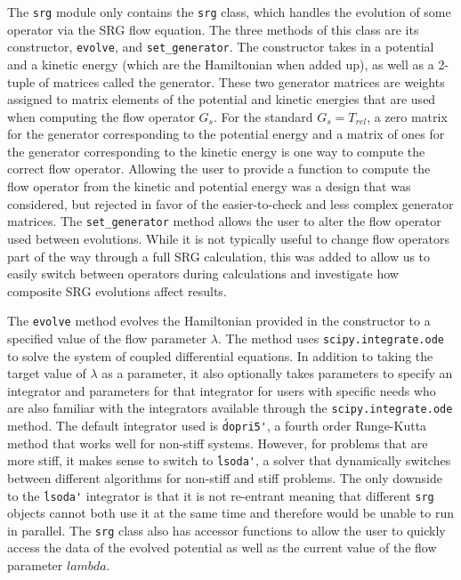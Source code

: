 The \texttt{srg} module only contains the \texttt{srg} class, which handles the evolution of some operator via the SRG flow equation. The three methods of this class are its constructor, \texttt{evolve}, and \texttt{set\_generator}. The constructor takes in a potential and a kinetic energy (which are the Hamiltonian when added up), as well as a 2-tuple of matrices called the generator. These two generator matrices are weights assigned to matrix elements of the potential and kinetic energies that are used when computing the flow operator $G_s$. For the standard $G_s = T_{rel}$, a zero matrix for the generator corresponding to the potential energy and a matrix of ones for the generator corresponding to the kinetic energy is one way to compute the correct flow operator. Allowing the user to provide a function to compute the flow operator from the kinetic and potential energy was a design that was considered, but rejected in favor of the easier-to-check and less complex generator matrices. The \texttt{set\_generator} method allows the user to alter the flow operator used between evolutions. While it is not typically useful to change flow operators part of the way through a full SRG calculation, this was added to allow us to easily switch between operators during calculations and investigate how composite SRG evolutions affect results.

The \texttt{evolve} method evolves the Hamiltonian provided in the constructor to a specified value of the flow parameter $\lambda$. The method uses \texttt{scipy.integrate.ode} to solve the system of coupled differential equations. In addition to taking the target value of $\lambda$ as a parameter, it also optionally takes parameters to specify an integrator and parameters for that integrator for users with specific needs who are also familiar with the integrators available through the \texttt{scipy.integrate.ode} method. The default integrator used is \texttt{\'dopri5\'}, a fourth order Runge-Kutta method that works well for non-stiff systems. However, for problems that are more stiff, it makes sense to switch to \texttt{\'lsoda\'}, a solver that dynamically switches between different algorithms for non-stiff and stiff problems. The only downside to the \texttt{\'lsoda\'} integrator is that it is not re-entrant meaning that different \texttt{srg} objects cannot both use it at the same time and therefore would be unable to run in parallel. The \texttt{srg} class also has accessor functions to allow the user to quickly access the data of the evolved potential as well as the current value of the flow parameter $lambda$.

